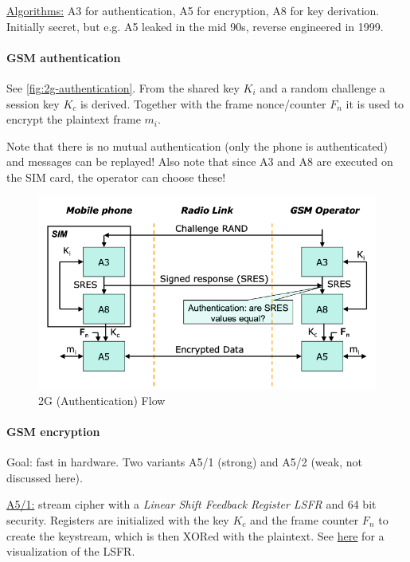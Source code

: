 \underline{Algorithms:}
A3 for authentication, A5 for encryption, A8 for key derivation.
Initially secret, but e.g. A5 leaked in the mid 90s, reverse engineered in 1999.

\paragraph{GSM authentication}
See \autoref{fig:2g-authentication}. From the shared key $K_i$ and a random
challenge a session key $K_c$ is derived. Together with the frame nonce/counter
$F_n$ it is used to encrypt the plaintext frame $m_i$.

Note that there is no mutual authentication (only the phone is authenticated)
and messages can be replayed! Also note that since A3 and A8 are executed on
the SIM card, the operator can choose these!

\begin{figure}[h]
	\centering
	\includegraphics[scale=0.5]{images/10-2g-authentication.png}
	\caption{2G (Authentication) Flow}
	\label{fig:2g-authentication}
\end{figure}

\paragraph{GSM encryption}
Goal: fast in hardware. Two variants A5/1 (strong) and A5/2 (weak, not
discussed here).

\underline{A5/1:} stream cipher with a \textit{Linear Shift Feedback Register LSFR} and 64 bit security.
Registers are initialized with the key $K_c$ and the frame counter $F_n$ to create the keystream, which is then XORed with the plaintext.
See \href{https://web.archive.org/web/20120326211404/http:/l-system.net.pl/crypto/A5\_1\_stream\_cipher.svg}{here} for a visualization of the LSFR.

